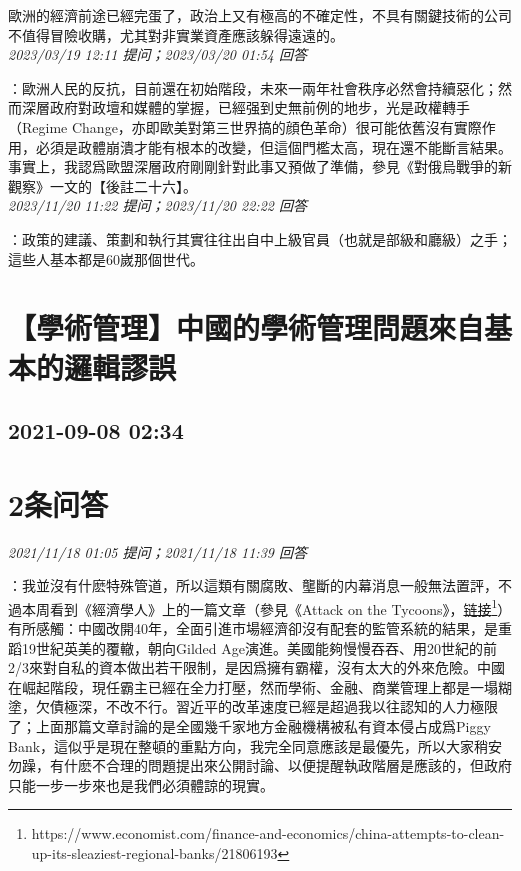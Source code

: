 \documentclass[twocolumn]{ctexart}
\begin{document}
歐洲的經濟前途已經完蛋了，政治上又有極高的不確定性，不具有關鍵技術的公司不值得冒險收購，尤其對非實業資產應該躲得遠遠的。
\\

\textit{\hfill\noindent\small 2023/03/19 12:11 提问；2023/03/20 01:54 回答}

：歐洲人民的反抗，目前還在初始階段，未來一兩年社會秩序必然會持續惡化；然而深層政府對政壇和媒體的掌握，已經强到史無前例的地步，光是政權轉手（Regime Change，亦即歐美對第三世界搞的顔色革命）很可能依舊沒有實際作用，必須是政體崩潰才能有根本的改變，但這個門檻太高，現在還不能斷言結果。事實上，我認爲歐盟深層政府剛剛針對此事又預做了準備，參見《對俄烏戰爭的新觀察》一文的【後註二十六】。
\\

\textit{\hfill\noindent\small 2023/11/20 11:22 提问；2023/11/20 22:22 回答}

：政策的建議、策劃和執行其實往往出自中上級官員（也就是部級和廳級）之手；這些人基本都是60嵗那個世代。
\\


\section{【學術管理】中國的學術管理問題來自基本的邏輯謬誤}
\subsection{2021-09-08 02:34}


\section{2条问答}

\textit{\hfill\noindent\small 2021/11/18 01:05 提问；2021/11/18 11:39 回答}

：我並沒有什麽特殊管道，所以這類有關腐敗、壟斷的内幕消息一般無法置評，不過本周看到《經濟學人》上的一篇文章（參見《Attack on the Tycoons》，\href{https://www.economist.com/finance-and-economics/china-attempts-to-clean-up-its-sleaziest-regional-banks/21806193}{链接\footnote{\url{https://www.economist.com/finance-and-economics/china-attempts-to-clean-up-its-sleaziest-regional-banks/21806193}}}）有所感觸：中國改開40年，全面引進市場經濟卻沒有配套的監管系統的結果，是重蹈19世紀英美的覆轍，朝向Gilded Age演進。美國能夠慢慢吞吞、用20世紀的前2/3來對自私的資本做出若干限制，是因爲擁有霸權，沒有太大的外來危險。中國在崛起階段，現任霸主已經在全力打壓，然而學術、金融、商業管理上都是一塌糊塗，欠債極深，不改不行。習近平的改革速度已經是超過我以往認知的人力極限了；上面那篇文章討論的是全國幾千家地方金融機構被私有資本侵占成爲Piggy Bank，這似乎是現在整頓的重點方向，我完全同意應該是最優先，所以大家稍安勿躁，有什麽不合理的問題提出來公開討論、以便提醒執政階層是應該的，但政府只能一步一步來也是我們必須體諒的現實。
\\
\end{document}
